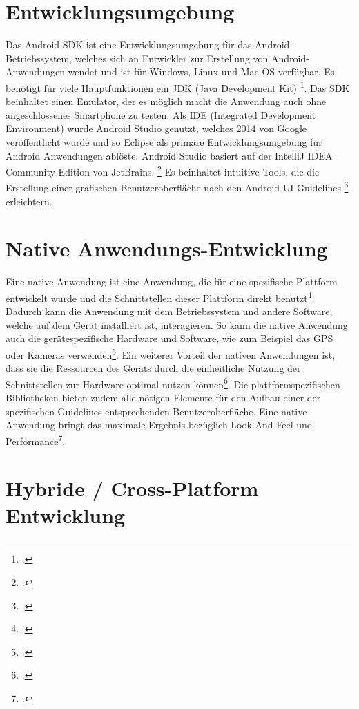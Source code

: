 \section{Entwicklungsumgebung}

Das Android SDK ist eine Entwicklungsumgebung für das Android Betriebssystem, welches sich an Entwickler zur Erstellung von Android-Anwendungen wendet und ist für Windows, Linux und Mac OS verfügbar. Es benötigt für viele Hauptfunktionen ein JDK (Java Development Kit) \footcite{AndroidSDK}. Das SDK beinhaltet einen Emulator, der es möglich macht die Anwendung auch ohne angeschlossenes Smartphone zu testen. Als IDE (Integrated Development Environment) wurde Android Studio genutzt, welches 2014 von Google veröffentlicht wurde und so Eclipse als primäre Entwicklungsumgebung für Android Anwendungen ablöste. Android Studio basiert auf der IntelliJ IDEA Community Edition von JetBrains. \footcite{AndroidOP} Es beinhaltet intuitive Tools, die die Erstellung einer grafischen Benutzeroberfläche nach den Android UI Guidelines \footcite{AndroidGuidelines} erleichtern. 

\section{Native Anwendungs-Entwicklung}

Eine native Anwendung ist eine Anwendung, die für eine spezifische Plattform entwickelt wurde und die Schnittstellen dieser Plattform direkt benutzt\footcite{Varianten}. Dadurch kann die Anwendung mit dem Betriebssystem und andere Software, welche auf dem Gerät installiert ist, interagieren. So kann die native Anwendung auch die gerätespezifische Hardware und Software, wie zum Beispiel das GPS oder Kameras verwenden\footcite{nativeApp1}. Ein weiterer Vorteil der nativen Anwendungen ist, dass sie die Ressourcen des Geräts durch die einheitliche Nutzung der Schnittstellen zur Hardware optimal nutzen können\footcite{nativeApp1}. Die plattformspezifischen Bibliotheken bieten zudem alle nötigen Elemente für den Aufbau einer der spezifischen Guidelines entsprechenden Benutzeroberfläche. Eine native Anwendung bringt das maximale  Ergebnis bezüglich Look-And-Feel und Performance\footcite{Varianten}.

\section{Hybride / Cross-Platform Entwicklung}

